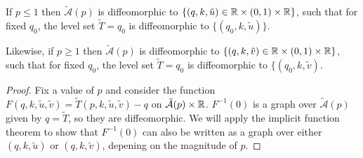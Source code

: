 \begin{lem}
\label{lem:T_graph}
If $p \leq 1$ then $\tilde{\mathcal{A}}(p)$ is diffeomorphic to $\{(q,k,\tilde{u}) \in \mathbb{R}\times(0,1)\times\mathbb{R} \}$, such that for fixed $q_0$, the level set $\tilde{T} = q_0$ is diffeomorphic to $\{(q_0,k,\tilde{u}) \}$.

Likewise, if $p \geq 1$ then $\tilde{\mathcal{A}}(p)$ is diffeomorphic to $\{(q,k,\tilde{v}) \in \mathbb{R}\times(0,1)\times\mathbb{R} \}$, such that for fixed $q_0$, the level set $\tilde{T} = q_0$ is diffeomorphic to $\{(q_0,k,\tilde{v})$.

\begin{proof}
Fix a value of $p$ and consider the function $F(q, k,\tilde{u},\tilde{v}) = \tilde{T}(p,k,\tilde{u},\tilde{v}) - q$ on $\mathcal{\tilde{A}}(p)\times\mathbb{R}$. $F^{-1}(0)$ is a graph over $\mathcal{\tilde{A}}(p)$ given by $q=\tilde{T}$, so they are diffeomorphic. We will apply the implicit function theorem to show that $F^{-1}(0)$ can also be written as a graph over either $(q,k,\tilde{u})$ or $(q,k,\tilde{v})$, depening on the magnitude of $p$.


\end{proof}
\end{lem}
